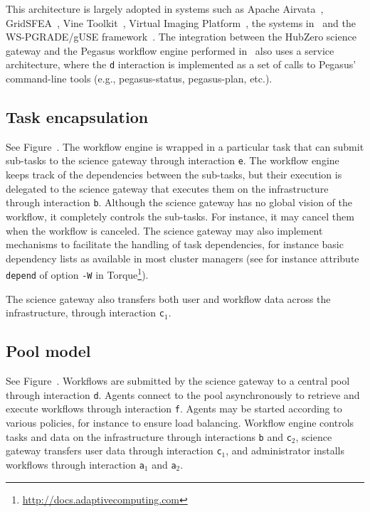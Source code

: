 \documentclass[preprint,3p,twocolumn]{elsarticle}
\newcommand{\correction}[1]{\color{blue}#1\color{black}\xspace}
\begin{document}
This architecture is largely adopted in systems such as Apache
Airvata~\cite{marru2011apache}, GridSFEA~\cite{Elts2010}, Vine
Toolkit~\cite{DBLP:journals/scpe/SzejnfeldDKKKKLPTWDNW10}, Virtual
Imaging Platform~\cite{GLAT-13}, the systems
in~\cite{wu2010accelerating,shahand:2012jgc} and the WS-PGRADE/gUSE
framework~\cite{Kacsuk2012}. The integration between the HubZero
science gateway and the Pegasus workflow engine performed
in~\cite{CPE:CPE3257} also uses a service architecture, where the
\texttt{d} interaction is implemented as a set of calls to Pegasus'
command-line tools (e.g., pegasus-status, pegasus-plan,
etc.). 

\subsection{Task encapsulation}

See Figure~. The workflow engine is wrapped in
a particular task that can submit sub-tasks to the science gateway
through interaction \texttt{e}. The workflow engine keeps track of
the dependencies between the sub-tasks, but their execution is
delegated to the science gateway that executes them on the
infrastructure through interaction \texttt{b}. Although the science
gateway has no global vision of the workflow, it completely \correction{controls}
the sub-tasks. \correction{For instance, it may cancel} them when
the \correction{workflow} is canceled. The science gateway may also implement
mechanisms to facilitate the handling of task dependencies, for
instance basic dependency lists as available in most cluster managers
(see for instance attribute \texttt{depend} of option \texttt{-W} in
Torque\footnote{\url{http://docs.adaptivecomputing.com}}).

The science gateway also transfers both user and workflow data across
the infrastructure, through interaction \texttt{c$_1$}.
\subsection{Pool model}
\label{sec:pool}
See Figure~. Workflows are submitted by the
science gateway to a central pool through interaction
\texttt{d}. Agents connect to the pool asynchronously to retrieve and
execute workflows through interaction \texttt{f}. Agents may be
started according to various policies, for instance to ensure load
balancing. Workflow engine controls tasks and data on the
infrastructure through interactions \texttt{b} and \texttt{c$_2$},
science gateway transfers user data through interaction
\texttt{c$_1$}, and administrator installs workflows through
interaction \texttt{a$_1$} and \texttt{a$_2$}.
\end{document}
